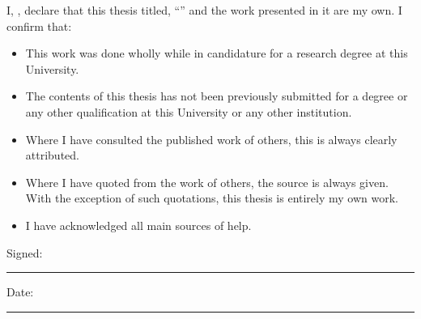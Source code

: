 \documentclass[
12pt, %
english, %
singlespacing, %
parskip, %
headsepline, %
openany,
]{MastersDoctoralThesis} %
\numberwithin{theorem}{section}
\numberwithin{remark}{section}
\numberwithin{assumption}{section}
\begin{document}

\begin{declaration}
\addchaptertocentry{\authorshipname} 
\vspace{1.5cm}

\noindent I, \authorname, declare that this thesis titled, \enquote{\ttitle} and the work presented in it are my own. I confirm that:

\begin{itemize} 
\item This work was done wholly while in candidature for a research degree at this University.
\item The contents of this thesis has not been previously submitted for a degree or any other qualification at this University or any other institution.
\item Where I have consulted the published work of others, this is always clearly attributed.
\item Where I have quoted from the work of others, the source is always given. With the exception of such quotations, this thesis is entirely my own work.
\item I have acknowledged all main sources of help.
\end{itemize}

\vspace{1cm}
\noindent Signed:\\
\rule[0.5em]{25em}{0.5pt} %
 
\noindent Date:\\
\rule[0.5em]{25em}{0.5pt} %
\end{declaration}

\end{document}
